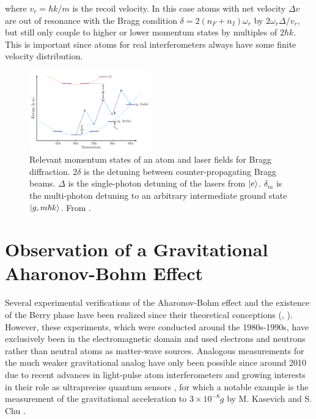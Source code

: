 \documentclass[reprint,
nofootinbib,
amsmath,amssymb,
aps]{revtex4-1}
\newcommand{\f}[2]{\frac{#1}{#2}}
\newcommand{\lb}{\left[}
\newcommand{\rb}{\right]}
\begin{document}
where $v_r = \hbar k/m$ is the recoil velocity. In this case atoms with net velocity $\Delta v$ are out of resonance with the Bragg condition $\delta = 2(n_F + n_I)\omega_r$ by $2\omega_r \Delta / v_r$, but still only couple to higher or lower momentum states by multiples of $2\hbar k$. This is important since atoms for real interferometers always have some finite velocity distribution. 

\begin{figure}
	\includegraphics[width=0.47\textwidth]{Bragg.png}
	\caption{Relevant momentum states of an atom and laser fields for Bragg diffraction. $2\delta$ is the detuning between counter-propagating Bragg beams. $\Delta$ is the single-photon detuning of the lasers from $\ket{e}$. $\delta_m$ is the multi-photon detuning to an arbitrary intermediate ground state $\ket{g,m\hbar k}$. From \cite{estey2016precision}.}
	\label{fig:Bragg}
\end{figure}



\section{Observation of a Gravitational Aharonov-Bohm Effect}\label{sect:grav}
Several experimental verifications of the Aharonov-Bohm effect and the existence of the Berry phase have been realized since their theoretical conceptions (\cite{tonomura1986evidence}, \cite{cimmino1989observation}). However, these experiments, which were conducted around the 1980s-1990s, have exclusively been in the electromagnetic domain and used electrons and neutrons rather than neutral atoms as matter-wave sources. Analogous measurements for the much weaker gravitational analog have only been possible since around 2010 due to recent advances in light-pulse atom interferometers and growing interests in their role as ultraprecise quantum sensors \cite{bongs2019taking}, for which a notable example is the measurement of the gravitational acceleration to $3\times 10^{-8} g$ by M. Kasevich and S. Chu \cite{kasevich1992measurement}. 
\end{document}
